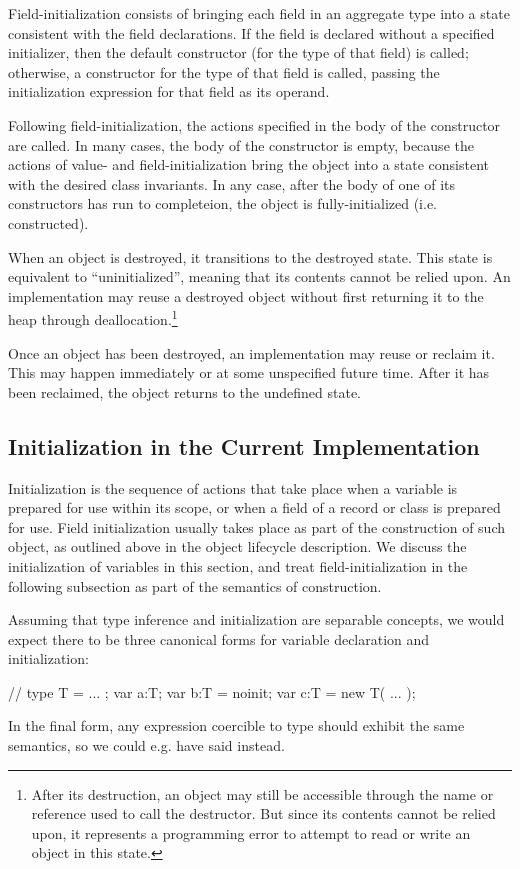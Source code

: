 Field-initialization consists of bringing each field in an aggregate type into a
state consistent with the field declarations.  If the field is declared without
a specified initializer, then the default constructor (for the type of that
field) is called; otherwise, a constructor for the type of that field is called,
passing the initialization expression for that field as its operand.

Following field-initialization, the actions specified in the body of the
constructor are called.  In many cases, the body of the constructor is empty,
because the actions of value- and field-initialization bring the object into a
state consistent with the desired class invariants.  In any case, after the body
of one of its constructors has run to completeion, the object is
fully-initialized (i.e. constructed).

When an object is destroyed, it transitions to the destroyed state.  This state
is equivalent to ``uninitialized'', meaning that its contents cannot be relied
upon.  An implementation may reuse a destroyed object without first returning it
to the heap through deallocation.\footnote{After its destruction, an object may
  still be accessible through the name or reference used to call the
  destructor.  But since its contents cannot be relied upon, it represents a
  programming error to attempt to read or write an object in this state.}

Once an object has been destroyed, an implementation may reuse or reclaim it.
This may happen immediately or at some unspecified future time.  After it has
been reclaimed, the object returns to the undefined state.


\subsection{Initialization in the Current Implementation}

Initialization is the sequence of actions that take place when a variable is prepared for
use within its scope, or when a field of a record or class is prepared for use.  Field
initialization usually takes place as part of the construction of such object, as outlined
above in the object lifecycle description.  We discuss the initialization of variables in
this section, and treat field-initialization in the following subsection as part of the
semantics of construction. 

Assuming that type inference and initialization are separable concepts, we would expect
there to be three canonical forms for variable declaration and initialization:
\begin{chapel}
// type T = ... ;
   var a:T;
   var b:T = noinit;
   var c:T = new T( ... );
\end{chapel}
In the final form, any expression coercible to type  should exhibit the same
semantics, so we could e.g. have said  instead.

